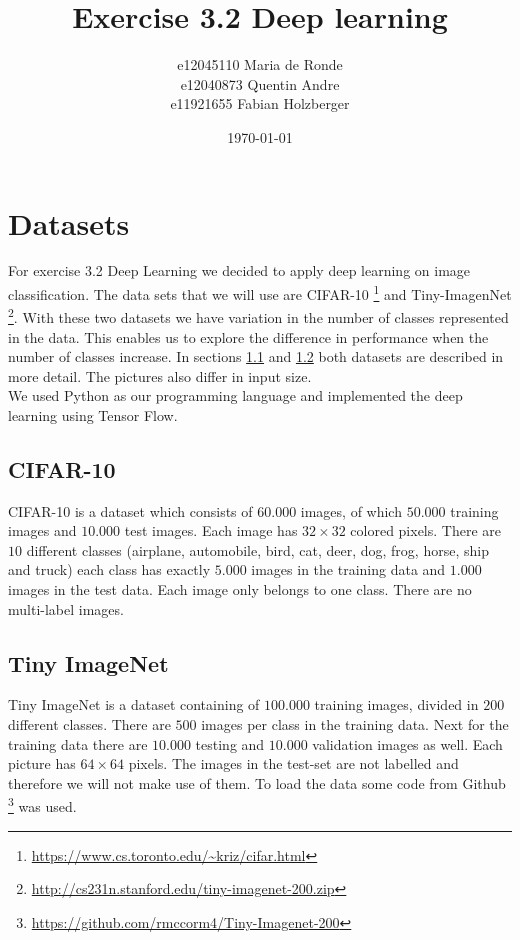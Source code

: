 \documentclass[11pt]{article}
\title{Exercise 3.2 Deep learning}
\author{e12045110 Maria de Ronde \\ e12040873  Quentin Andre  \\ e11921655 Fabian Holzberger}
\date{\today}
\begin{document}
\graphicspath{{./pictures/}}
\maketitle
\tableofcontents

%
\section{Datasets}
For exercise 3.2 Deep Learning we decided to apply deep learning on image classification. The data sets that we will use are CIFAR-10 \footnote{\url{https://www.cs.toronto.edu/~kriz/cifar.html}} and Tiny-ImagenNet  \footnote{\url{http://cs231n.stanford.edu/tiny-imagenet-200.zip}}. With these two datasets we have variation in the number of classes represented in the data. This  enables us to explore the difference in performance when the number of classes increase. In sections \ref{Sec_Cifar-10} and \ref{Sec_ImageNet} both datasets are described in more detail. The pictures also differ in input size.\\
We used Python as our programming language and implemented the deep learning using Tensor Flow. 


\subsection{CIFAR-10}\label{Sec_Cifar-10}
CIFAR-10 is a dataset which consists of $60.000$ images, of which $50.000$ training images and $10.000$ test images. Each image has $32\times32$ colored pixels.
There are $10$ different classes (airplane, automobile, bird, cat, deer, dog, frog, horse, ship and truck) each class has exactly $5.000$ images in the training data and $1.000$ images in the test data. Each image only belongs to one class. There are no multi-label images. 

\subsection{Tiny ImageNet}\label{Sec_ImageNet}
Tiny ImageNet is a dataset containing of $100.000$ training images, divided in $200$ different classes. There are $500$ images per class in the training data. Next for the training data there are $10.000$ testing and $10.000$ validation images as well. Each picture has $64\times64$ pixels. The images in the test-set are not labelled and therefore we will not make use of them. To load the data some code from Github \footnote{\url{https://github.com/rmccorm4/Tiny-Imagenet-200}} was used. 
\end{document}
